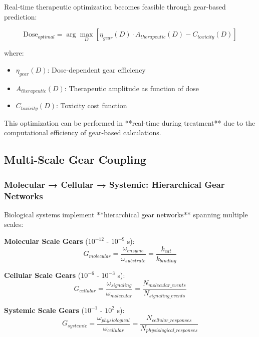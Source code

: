 Real-time therapeutic optimization becomes feasible through gear-based prediction:

\begin{equation}
\text{Dose}_{optimal} = \arg\max_{D} \left[\eta_{gear}(D) \cdot A_{therapeutic}(D) - C_{toxicity}(D)\right]
\end{equation}

where:
\begin{itemize}
\item $\eta_{gear}(D)$: Dose-dependent gear efficiency
\item $A_{therapeutic}(D)$: Therapeutic amplitude as function of dose
\item $C_{toxicity}(D)$: Toxicity cost function
\end{itemize}

This optimization can be performed in **real-time during treatment** due to the computational efficiency of gear-based calculations.

\subsection{Multi-Scale Gear Coupling}

\subsubsection{Molecular → Cellular → Systemic: Hierarchical Gear Networks}

Biological systems implement **hierarchical gear networks** spanning multiple scales:

\textbf{Molecular Scale Gears} ($10^{-12}$ - $10^{-9}$ s):
\begin{equation}
G_{molecular} = \frac{\omega_{enzyme}}{\omega_{substrate}} = \frac{k_{cat}}{k_{binding}}
\end{equation}

\textbf{Cellular Scale Gears} ($10^{-6}$ - $10^{-3}$ s):
\begin{equation}
G_{cellular} = \frac{\omega_{signaling}}{\omega_{molecular}} = \frac{N_{molecular\_events}}{N_{signaling\_events}}
\end{equation}

\textbf{Systemic Scale Gears} ($10^{-1}$ - $10^{2}$ s):
\begin{equation}
G_{systemic} = \frac{\omega_{physiological}}{\omega_{cellular}} = \frac{N_{cellular\_responses}}{N_{physiological\_responses}}
\end{equation}

